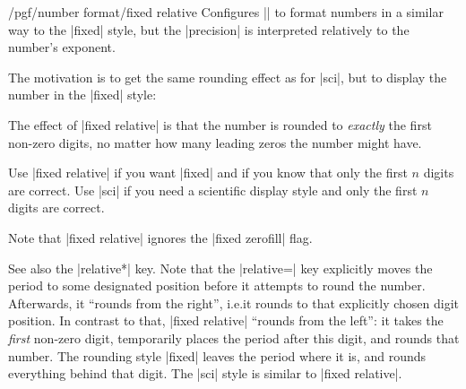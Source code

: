 \begin{keylist}{/pgf/number format/fixed relative}
    Configures |\pgfmathprintnumber| to format numbers in a similar way to the
    |fixed| style, but the |precision| is interpreted relatively to the
    number's exponent.

    The motivation is to get the same rounding effect as for |sci|, but to
    display the number in the |fixed| style:
\begin{codeexample}[pre={\begin{lateximage}},post={\end{lateximage}}]
\hspace{1em}
\hspace{1em}
\hspace{1em}
\hspace{1em}
\hspace{1em}
\hspace{1em}
\hspace{1em}
\end{codeexample}

    The effect of |fixed relative| is that the number is rounded to
    \emph{exactly} the first  non-zero digits, no matter how
    many leading zeros the number might have.

    Use |fixed relative| if you want |fixed| and if you know that only the
    first $n$ digits are correct. Use |sci| if you need a scientific display
    style and only the first $n$ digits are correct.

    Note that |fixed relative| ignores the |fixed zerofill| flag.

    See also the |relative*| key. Note that the |relative=| key
    explicitly moves the period to some designated position before it attempts
    to round the number. Afterwards, it ``rounds from the right'', i.e.\@ it
    rounds to that explicitly chosen digit position. In contrast to that,
    |fixed relative| ``rounds from the left'': it takes the \emph{first}
    non-zero digit, temporarily places the period after this digit, and rounds
    that number. The rounding style |fixed| leaves the period where it is, and
    rounds everything behind that digit. The |sci| style is similar to
    |fixed relative|.
\end{keylist}

